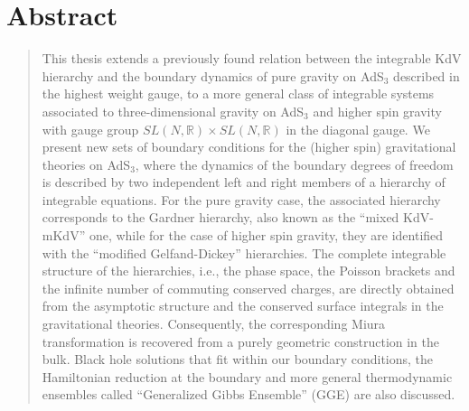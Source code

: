 \documentclass[letterpaper,11pt,oneside]{book}
\begin{document}
\chapter*{Abstract}
\begin{quotation}		
This thesis extends a previously found relation between the integrable KdV hierarchy and the boundary dynamics of pure gravity on AdS$_3$ described in the highest weight gauge, to a more general class of integrable systems associated to three-dimensional gravity on AdS$_3$ and higher spin gravity with
gauge group $SL(N,\mathbb{R})\times SL(N,\mathbb{R})$ in the diagonal gauge. We present new sets of boundary conditions for the (higher spin) gravitational theories on AdS$_3$, where the dynamics of the boundary degrees of freedom is described by two independent left and right members of a hierarchy of integrable equations. For the pure gravity case, the associated hierarchy corresponds to the  Gardner hierarchy, also known as the ``mixed KdV-mKdV'' one, while for the case of higher spin gravity, they are identified with the ``modified Gelfand-Dickey'' hierarchies. The complete integrable structure of the hierarchies, i.e., the phase space, the Poisson brackets and the infinite number of commuting conserved charges, are directly obtained from the asymptotic structure and the conserved surface integrals in the gravitational theories. Consequently, the corresponding Miura transformation is recovered from a purely geometric construction in the bulk. Black hole solutions that fit within our boundary conditions, the Hamiltonian reduction at the boundary and more general thermodynamic ensembles called ``Generalized Gibbs Ensemble'' (GGE) are also discussed.
	
		
\end{quotation}

\afterpage{\null\newpage}

\newpage
\thispagestyle{plain}
\doublespacing
\tableofcontents





\end{document}
